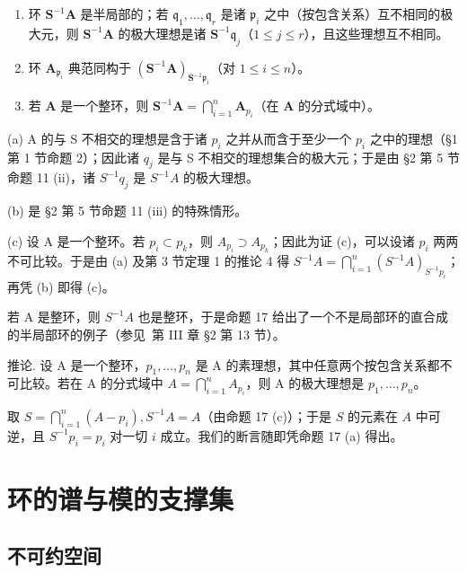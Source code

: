 \begin{enumerate}
\def\labelenumi{(\alph{enumi})}
\item
  环 \(\mathbf{S}^{-1}\mathbf{A}\) 是半局部的；若 \(\mathfrak{q}_1, \ldots, \mathfrak{q}_r\) 是诸 \(\mathfrak{p}_i\) 之中（按包含关系）互不相同的极大元，则 \(\mathbf{S}^{-1}\mathbf{A}\) 的极大理想是诸 \(\mathbf{S}^{-1}\mathfrak{q}_j\)（\(1 \leqslant j \leqslant r\)），且这些理想互不相同。
\item
  环 \(\mathbf{A}_{\mathfrak{p}_i}\) 典范同构于 \((\mathbf{S}^{-1}\mathbf{A})_{\mathbf{S}^{-1}\mathfrak{p}_i}\)（对 \(1 \leqslant i \leqslant n\)）。
\item
  若 \(\mathbf{A}\) 是一个整环，则 \(\mathbf{S}^{-1}\mathbf{A} = \bigcap_{i=1}^{n}\mathbf{A}_{p_i}\)（在 \(\mathbf{A}\) 的分式域中）。
\end{enumerate}

(a) A 的与 S 不相交的理想是含于诸 \(p_{i}\) 之并从而含于至少一个 \(p_{i}\) 之中的理想（§1 第 1 节命题 2）；因此诸 \(q_{j}\) 是与 S 不相交的理想集合的极大元；于是由 §2 第 5 节命题 11 (ii)，诸 \(S^{-1}q_{j}\) 是 \(S^{-1}A\) 的极大理想。

(b) 是 §2 第 5 节命题 11 (iii) 的特殊情形。

(c) 设 A 是一个整环。若 \(p_{i} \subset p_{k}\)，则 \(A_{p_{i}} \supset A_{p_{k}}\)；因此为证 (c)，可以设诸 \(p_{i}\) 两两不可比较。于是由 (a) 及第 3 节定理 1 的推论 4 得 \(S^{-1}A = \bigcap_{i=1}^{n} (S^{-1}A)_{S^{-1}p_{i}}\)；再凭 (b) 即得 (c)。

若 A 是整环，则 \(S^{-1}A\) 也是整环，于是命题 17 给出了一个不是局部环的直合成的半局部环的例子（参见~第 III 章 §2 第 13 节）。

推论. 设 A 是一个整环，\(p_{1}, \ldots, p_{n}\) 是 A 的素理想，其中任意两个按包含关系都不可比较。若在 A 的分式域中 \(A = \bigcap_{i=1}^{n} A_{p_{i}}\)，则 A 的极大理想是 \(p_{1}, \ldots, p_{n}\)。

取 \(S = \bigcap_{i=1}^{n} (A - p_i), S^{-1} A = A\)（由命题 17 (c)）；于是 \(S\) 的元素在 \(A\) 中可逆，且 \(S^{-1} p_i = p_i\) 对一切 \(i\) 成立。我们的断言随即凭命题 17 (a) 得出。

\section{环的谱与模的支撑集}

\subsection{不可约空间}

